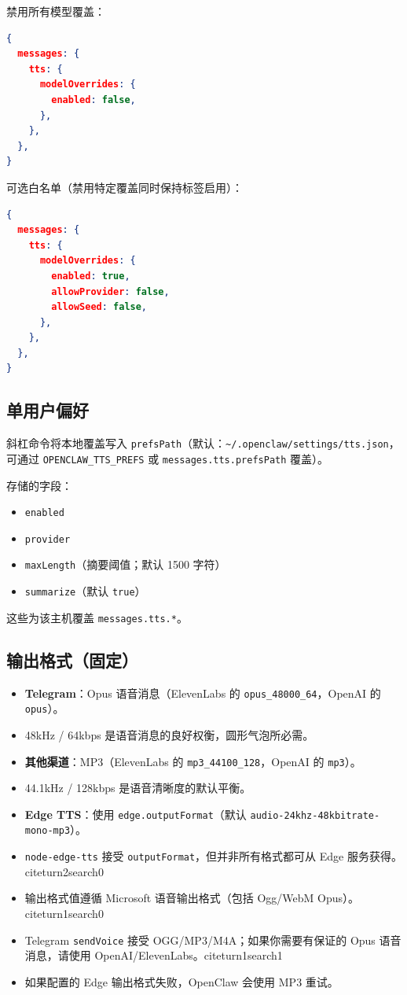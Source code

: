 禁用所有模型覆盖：

\begin{lstlisting}[language=json]
{
  messages: {
    tts: {
      modelOverrides: {
        enabled: false,
      },
    },
  },
}
\end{lstlisting}


可选白名单（禁用特定覆盖同时保持标签启用）：

\begin{lstlisting}[language=json]
{
  messages: {
    tts: {
      modelOverrides: {
        enabled: true,
        allowProvider: false,
        allowSeed: false,
      },
    },
  },
}
\end{lstlisting}


\subsection{单用户偏好}


斜杠命令将本地覆盖写入 \texttt{prefsPath}（默认：\texttt{\textasciitilde{}/.openclaw/settings/tts.json}，可通过 \texttt{OPENCLAW\_TTS\_PREFS} 或 \texttt{messages.tts.prefsPath} 覆盖）。

存储的字段：

\begin{itemize}
  \item \texttt{enabled}
  \item \texttt{provider}
  \item \texttt{maxLength}（摘要阈值；默认 1500 字符）
  \item \texttt{summarize}（默认 \texttt{true}）
\end{itemize}


这些为该主机覆盖 \texttt{messages.tts.*}。

\subsection{输出格式（固定）}


\begin{itemize}
  \item \textbf{Telegram}：Opus 语音消息（ElevenLabs 的 \texttt{opus\_48000\_64}，OpenAI 的 \texttt{opus}）。
  \item 48kHz / 64kbps 是语音消息的良好权衡，圆形气泡所必需。
  \item \textbf{其他渠道}：MP3（ElevenLabs 的 \texttt{mp3\_44100\_128}，OpenAI 的 \texttt{mp3}）。
  \item 44.1kHz / 128kbps 是语音清晰度的默认平衡。
  \item \textbf{Edge TTS}：使用 \texttt{edge.outputFormat}（默认 \texttt{audio-24khz-48kbitrate-mono-mp3}）。
  \item \texttt{node-edge-tts} 接受 \texttt{outputFormat}，但并非所有格式都可从 Edge 服务获得。citeturn2search0
  \item 输出格式值遵循 Microsoft 语音输出格式（包括 Ogg/WebM Opus）。citeturn1search0
  \item Telegram \texttt{sendVoice} 接受 OGG/MP3/M4A；如果你需要有保证的 Opus 语音消息，请使用 OpenAI/ElevenLabs。citeturn1search1
  \item 如果配置的 Edge 输出格式失败，OpenClaw 会使用 MP3 重试。
\end{itemize}


